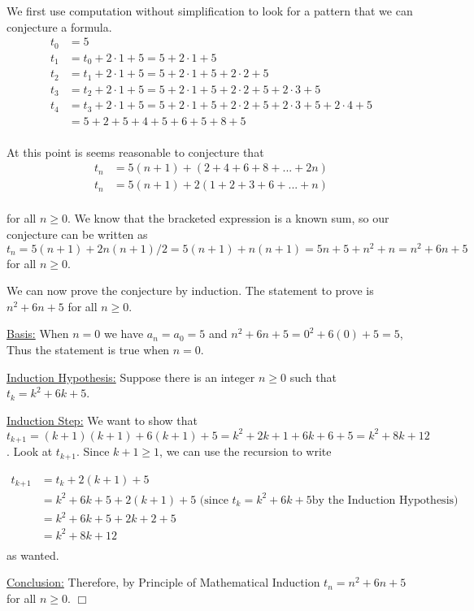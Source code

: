 \documentclass{article}
\begin{document}
\smallskip
We first use computation without simplification to look for a pattern that we can conjecture a formula.
\begin{equation*}
\begin{split}
   {t_0} & =5\\
   {t_1} & ={t_0}+2\cdot1+5=5+2\cdot1+5\\
   {t_2} & ={t_1}+2\cdot1+5=5+2\cdot1+5+2\cdot2+5\\
   {t_3} & ={t_2}+2\cdot1+5=5+2\cdot1+5+2\cdot2+5+2\cdot3+5\\
   {t_4} & ={t_3}+2\cdot1+5=5+2\cdot1+5+2\cdot2+5+2\cdot3+5+2\cdot4+5\\
         & =5+2+5+4+5+6+5+8+5\\
\end{split}
\end{equation*}

\bigskip
\bigskip
\bigskip
At this point is seems reasonable to conjecture that 
\smallskip
\begin{equation*}
\begin{split}
    {t_n} & =5(n+1)+(2+4+6+8+...+2n)\\
    {t_n} & =5(n+1)+2(1+2+3+6+...+n)\\
\end{split}
\end{equation*}

for all $n \geq 0$. We know that the bracketed expression is a known sum, so our conjecture can be written as ${t_n}=5(n+1)+2n(n+1)/2=5(n+1)+n(n+1)=5n+5+n^2+n=n^2+6n+5$ 
for all $n \geq 0$.

\smallskip
We can now prove the conjecture by induction. The statement to prove is $n^2+6n+5$ for all $n \geq 0$.


\smallskip
\underline{Basis:} When $n=0$ we have ${a_n}={a_0}=5$ and $n^2+6n+5=0^2+6(0)+5=5$, Thus the statement is true when $n=0$. 

\smallskip
\underline{Induction Hypothesis:} Suppose there is an integer $n \geq 0$ such that ${t_k}=k^2+6k+5$.

\smallskip
\underline{Induction Step:} We want to show that 
${t_k}{_+}{_1}=(k+1)(k+1)+6(k+1)+5=k^2+2k+1+6k+6+5=k^2+8k+12$.
Look at ${t_k}{_+}{_1}$. Since $k+1 \geq 1$, we can use the recursion to write

\begin{equation*}
\begin{split}
    {t_k}{_+}{_1} & ={t_k}+2(k+1)+5\\
    & = {k^2}+6k+5+2(k+1)+5 \text{ (since } t_k=k^2+6k+5 \text{by the Induction Hypothesis})\\
    & = {k^2}+6k+5+2k+2+5\\
    & = {k^2}+8k+12\\
\end{split}
\end{equation*}
as wanted.

\smallskip
\underline{Conclusion:} Therefore, by Principle of Mathematical Induction ${t_n}=n^2+6n+5$ for all $n \geq 0$.
$\Box$
\end{document}
